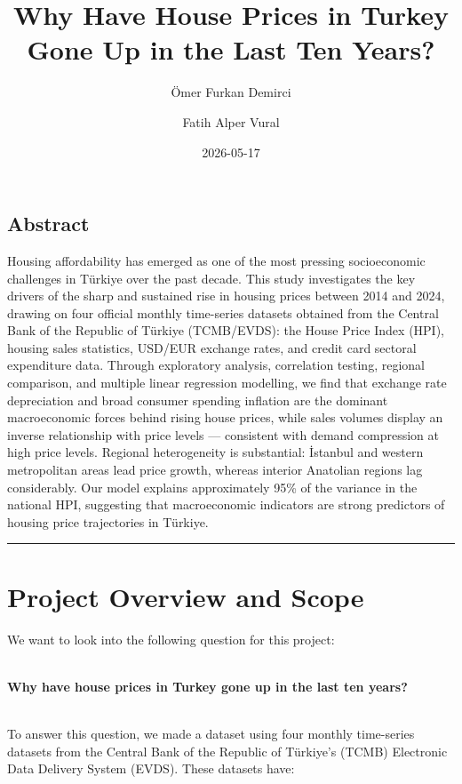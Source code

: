 \documentclass[
  11pt,
  a4paper,
  DIV=11,
  numbers=noendperiod]{scrartcl}
\title{Why Have House Prices in Turkey Gone Up in the Last Ten Years?}
\author{Ömer Furkan Demirci \and Fatih Alper Vural}
\date{2026-05-17}
\renewcommand*\contentsname{Table of contents}
\newcommand\contentsname{Table of contents}
\begin{document}
\maketitle

\renewcommand*\contentsname{Table of contents}
{
\setcounter{tocdepth}{3}
\tableofcontents
}

\subsection*{Abstract}\label{abstract}

Housing affordability has emerged as one of the most pressing
socioeconomic challenges in Türkiye over the past decade. This study
investigates the key drivers of the sharp and sustained rise in housing
prices between 2014 and 2024, drawing on four official monthly
time-series datasets obtained from the Central Bank of the Republic of
Türkiye (TCMB/EVDS): the House Price Index (HPI), housing sales
statistics, USD/EUR exchange rates, and credit card sectoral expenditure
data. Through exploratory analysis, correlation testing, regional
comparison, and multiple linear regression modelling, we find that
exchange rate depreciation and broad consumer spending inflation are the
dominant macroeconomic forces behind rising house prices, while sales
volumes display an inverse relationship with price levels --- consistent
with demand compression at high price levels. Regional heterogeneity is
substantial: İstanbul and western metropolitan areas lead price growth,
whereas interior Anatolian regions lag considerably. Our model explains
approximately 95\% of the variance in the national HPI, suggesting that
macroeconomic indicators are strong predictors of housing price
trajectories in Türkiye.

\begin{center}\rule{0.5\linewidth}{0.5pt}\end{center}

\section{Project Overview and Scope}\label{project-overview-and-scope}

We want to look into the following question for this project:\\
\strut \\
\textbf{Why have house prices in Turkey gone up in the last ten
years?}\\
\strut \\
To answer this question, we made a dataset using four monthly
time-series datasets from the Central Bank of the Republic of Türkiye's
(TCMB) Electronic Data Delivery System (EVDS). These datasets have:\\
\end{document}
